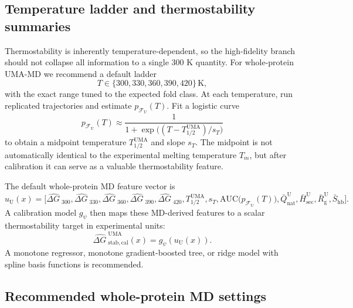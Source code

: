 \documentclass[11pt]{article}
\newcommand{\dG}{\ensuremath{\Delta G \ }}
\begin{document}
	\subsection{Temperature ladder and thermostability summaries}
	
	Thermostability is inherently temperature-dependent, so the high-fidelity branch should not collapse all information to a single $300$ K quantity. For whole-protein UMA-MD we recommend a default ladder
	\[
	T\in\{300,330,360,390,420\}\,\mathrm K,
	\]
	with the exact range tuned to the expected fold class. At each temperature, run replicated trajectories and estimate $p_{\mathcal F_{\mathrm U}}(T)$. Fit a logistic curve
	\begin{equation}
		p_{\mathcal F_{\mathrm U}}(T)\approx \frac{1}{1+\exp\big((T-T_{1/2}^{\mathrm{UMA}})/s_T\big)}
	\end{equation}
	to obtain a midpoint temperature $T_{1/2}^{\mathrm{UMA}}$ and slope $s_T$. The midpoint is not automatically identical to the experimental melting temperature $T_m$, but after calibration it can serve as a valuable thermostability feature.
	
	The default whole-protein MD feature vector is
	\begin{equation}
		\label{eq:umafeatures}
		u_{\mathrm U}(x)=\Big[\widehat{\dG}_{300},\widehat{\dG}_{330},\widehat{\dG}_{360},\widehat{\dG}_{390},\widehat{\dG}_{420},T_{1/2}^{\mathrm{UMA}},s_T,\mathrm{AUC}\big(p_{\mathcal F_{\mathrm U}}(T)\big),\bar Q_{\mathrm{nat}}^{\mathrm U},\bar H_{\mathrm{sec}}^{\mathrm U},\bar R_{\mathrm g}^{\mathrm U},\bar S_{\mathrm{hb}}\Big].
	\end{equation}
	A calibration model $g_\psi$ then maps these MD-derived features to a scalar thermostability target in experimental units:
	\begin{equation}
		\widehat{\dG}^{\mathrm{UMA}}_{\mathrm{stab,cal}}(x)=g_\psi\!\left(u_{\mathrm U}(x)\right).
	\end{equation}
	A monotone regressor, monotone gradient-boosted tree, or ridge model with spline basis functions is recommended.
	
	\subsection{Recommended whole-protein MD settings}
	
\end{document}
